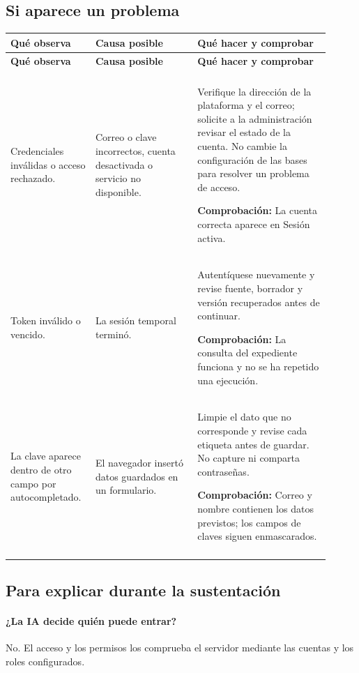 \subsection{Si aparece un problema}
\begingroup
\fontsize{10}{12.5}\selectfont
\setlength{\tabcolsep}{5pt}
\renewcommand{\arraystretch}{1.15}
\begin{longtable}{@{}>{\RaggedRight\arraybackslash}p{0.22\linewidth}>{\RaggedRight\arraybackslash}p{0.3\linewidth}>{\RaggedRight\arraybackslash}p{0.39\linewidth}@{}}
\toprule
\textbf{Qué observa} & \textbf{Causa posible} & \textbf{Qué hacer y comprobar} \\
\midrule
\endfirsthead
\toprule
\textbf{Qué observa} & \textbf{Causa posible} & \textbf{Qué hacer y comprobar} \\
\midrule
\endhead
\midrule
\multicolumn{3}{r}{\footnotesize Continúa en la página siguiente}\\
\endfoot
\bottomrule
\endlastfoot
Credenciales inválidas o acceso rechazado. & Correo o clave incorrectos, cuenta desactivada o servicio no disponible. & Verifique la dirección de la plataforma y el correo; solicite a la administración revisar el estado de la cuenta. No cambie la configuración de las bases para resolver un problema de acceso.\par\smallskip\textbf{Comprobación:} La cuenta correcta aparece en Sesión activa. \\
\addlinespace[3pt]
Token inválido o vencido. & La sesión temporal terminó. & Autentíquese nuevamente y revise fuente, borrador y versión recuperados antes de continuar.\par\smallskip\textbf{Comprobación:} La consulta del expediente funciona y no se ha repetido una ejecución. \\
\addlinespace[3pt]
La clave aparece dentro de otro campo por autocompletado. & El navegador insertó datos guardados en un formulario. & Limpie el dato que no corresponde y revise cada etiqueta antes de guardar. No capture ni comparta contraseñas.\par\smallskip\textbf{Comprobación:} Correo y nombre contienen los datos previstos; los campos de claves siguen enmascarados. \\
\addlinespace[3pt]
\end{longtable}
\endgroup

\subsection{Para explicar durante la sustentación}
\paragraph{¿La IA decide quién puede entrar?} No. El acceso y los permisos los comprueba el servidor mediante las cuentas y los roles configurados.

